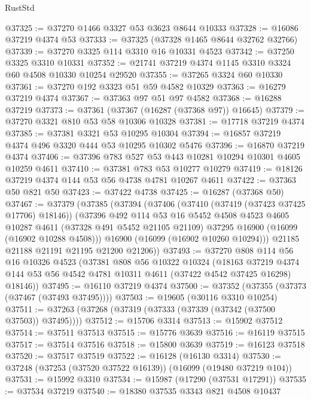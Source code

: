 \begin{lexlean}{RustStd}
\begin{coremodule}
@37325 := @37270 @1466 @3327 @53 @3623 @8644 @10333
@37328 := @16086 @37219 @4374 @53
@37333 := @37325 (@37328 @1465 @8644 @32762 @32766)
@37339 := @37270 @3325 @114 @3310 @16 @10331 @4523
@37342 := @37250 @3325 @3310 @10331
@37352 := @21741 @37219 @4374 @1145 @3310 @3324 @60 @4508 @10330 @10254 @29520
@37355 := @37265 @3324 @60 @10330
@37361 := @37270 @192 @3323 @51 @59 @4582 @10329
@37363 := @16279 @37219 @4374
@37367 := @37363 @97 @51 @97 @4582
@37368 := @16288 @37219
@37373 := @37361 (@37367 (@16287 (@37368 @97)) @16645)
@37379 := @37270 @3321 @810 @53 @58 @10306 @10328
@37381 := @17718 @37219 @4374
@37385 := @37381 @3321 @53 @10295 @10304
@37394 := @16857 @37219 @4374 @496 @3320 @444 @53 @10295 @10302 @5476
@37396 := @16870 @37219 @4374
@37406 := @37396 @783 @527 @53 @443 @10281 @10294 @10301 @4605 @10259 @4611
@37410 := @37381 @783 @53 @10277 @10279
@37419 := @18126 @37219 @4374 @144 @53 @56 @4738 @4781 @10267 @4611
@37422 := @37363 @50 @821 @50
@37423 := @37422 @4738
@37425 := @16287 (@37368 @50)
@37467 := @37379
    (@37385
      (@37394
        (@37406
          (@37410 (@37419 (@37423 @37425 @17706) @18146))
          (@37396
            @492
            @114
            @53
            @16
            @5452
            @4508
            @4523
            @4605
            @10287
            @4611
            (@37328 @491 @5452 @21105 @21109)
            @37295
            @16900
            (@16099 (@16902 @10288 @4508)))
          @16900
          (@16099 (@16902 @10260 @10294)))
        @21185
        @21188
        @21191
        @21195
        @21200
        @21206))
@37493 := @37270
    @808
    @114
    @56
    @16
    @10326
    @4523
    (@37381
      @808
      @56
      @10322
      @10324
      (@18163
        @37219
        @4374
        @144
        @53
        @56
        @4542
        @4781
        @10311
        @4611
        (@37422 @4542 @37425 @16298)
        @18146))
@37495 := @16110 @37219 @4374
@37500 := @37352 (@37355 (@37373 (@37467 (@37493 @37495))))
@37503 := @19605 (@30116 @3310 @10254)
@37511 := @37263 (@37268 (@37319 (@37333 (@37339 (@37342 (@37500 @37503)) @37495))))
@37512 := @15706 @3314
@37513 := @15902 @37512
@37514 := @37511 @37513
@37515 := @15776 @3639
@37516 := @16119 @37515
@37517 := @37514 @37516
@37518 := @15800 @3639
@37519 := @16123 @37518
@37520 := @37517 @37519
@37522 := @16128 (@16130 @3314)
@37530 := @37248 (@37253 (@37520 @37522 @16139)) (@16099 (@19480 @37219 @104))
@37531 := @15992 @3310
@37534 := @15987 (@17290 (@37531 @17291))
@37535 := @37534 @37219
@37540 := @18380 @37535 @3343 @821 @4508 @10437

\end{coremodule}
\end{lexlean}
